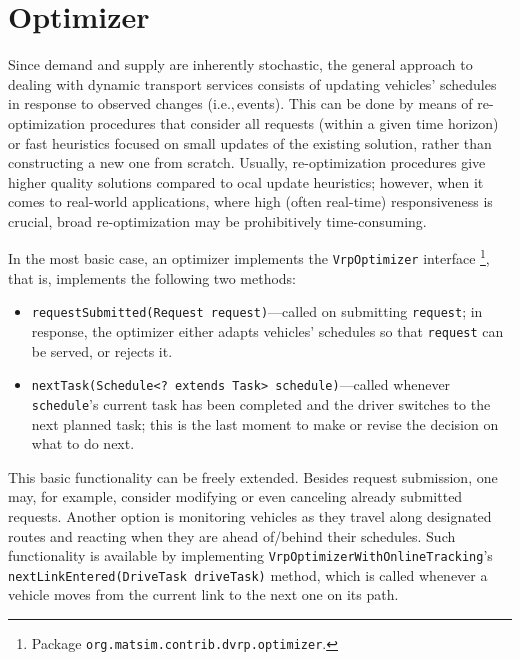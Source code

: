 \section{Optimizer}
\label{sec:VRP-optimizer}
Since demand and supply are inherently stochastic, the general approach to dealing with dynamic transport services consists of updating vehicles' schedules in response to observed changes (i.e.,\,events). This can be done by means of re-optimization procedures that consider all requests (within a given time horizon) or fast heuristics focused on small updates of the existing solution, rather than constructing a new one from scratch. Usually, re-optimization procedures give higher quality  solutions compared to ocal update heuristics; however, when it comes to real-world applications, where high (often real-time) responsiveness is crucial, broad re-optimization may be prohibitively time-consuming.

In the most basic case, an optimizer implements the \lstinline$VrpOptimizer$ interface%
\footnote{
Package \lstinline$org.matsim.contrib.dvrp.optimizer$.
},
that is, implements the following two methods:
%
\begin{itemize}
	\item \lstinline$requestSubmitted(Request request)$---called on submitting \lstinline$request$; in response, the optimizer either adapts vehicles' schedules so that \lstinline$request$ can be served, or rejects it.
	
	\item \lstinline$nextTask(Schedule<? extends Task> schedule)$---called whenever \lstinline$schedule$'s current task has been completed and the driver switches to the next planned task; this is the last moment to make or revise the decision on what to do next.

\end{itemize}

This basic functionality can be freely extended. Besides request submission, one may, for example, consider modifying or even canceling already submitted requests. Another option is monitoring vehicles as they travel along designated routes and reacting when they are ahead of/behind their schedules. Such functionality is available by implementing \lstinline$VrpOptimizerWithOnlineTracking$'s \lstinline$nextLinkEntered(DriveTask driveTask)$ method, which is called whenever a vehicle moves from the current link to the next one on its path.

